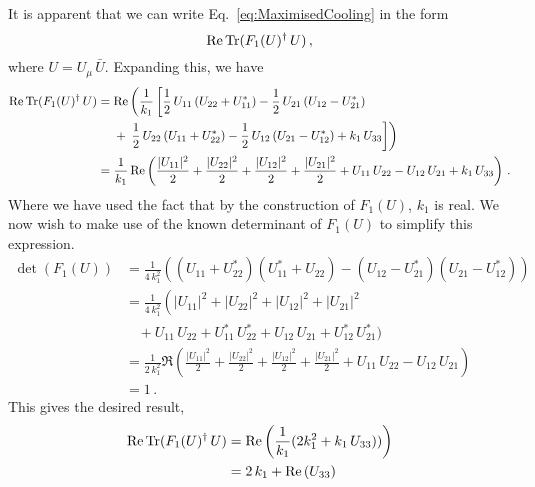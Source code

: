 It is apparent that we can write Eq.~\ref{eq:MaximisedCooling} in the form
\begin{equation}
\operatorname{Re}\operatorname{Tr}(F_1(U)^\dagger\, U)\, ,
\end{equation}
where $U = U_\mu\, \bar{U}$. Expanding this, we have
\begin{align*}
\operatorname{Re}\operatorname{Tr}(F_1(U)^\dagger\, U) &=\operatorname{Re} \left(\frac{1}{k_1}\left[ \frac{1}{2}\,U_{11} \left(U_{22} + U_{11}^*\right) - \frac{1}{2}\,U_{21} \left(U_{12} - U_{21}^*\right)\right.\right.\\
&~~~~+ \left. \left.\frac{1}{2}\,U_{22} \left(U_{11} + U_{22}^*\right)
- \frac{1}{2}\,U_{12} \left(U_{21} - U_{12}^*\right) +k_1\,U_{33}\right]\right)\\
&= \frac{1}{k_1}\operatorname{Re}\left(\frac{|U_{11}|^2}{2} + \frac{|U_{22}|^2}{2} + \frac{|U_{12}|^2}{2} + \frac{|U_{21}|^2}{2} + U_{11}\,U_{22} - U_{12}\,U_{21} + k_1\,U_{33}\right)\, .
\end{align*}
Where we have used the fact that by the construction of $F_1(U)$, $k_1$ is real. We now wish to make use of the known determinant of $F_1(U)$ to simplify this expression.
\begin{align*}
\det(F_1(U)) &= \frac{1}{4\,k_1^2} \left(\left(U_{11}+ U_{22}^*\right)\left(U_{11}^* + U_{22}\right)-\left(U_{12} - U_{21}^*\right)\left( U_{21} - U_{12}^*\right)\right)\\
&=\frac{1}{4\,k_1^2}\left( |U_{11}|^2 + |U_{22}|^2 + |U_{12}|^2 + |U_{21}|^2\right.\\
&~~~~+ U_{11}\,U_{22} + U_{11}^*\,U_{22}^* + U_{12}\,U_{21} + U_{12}^*\,U_{21}^*\big)\\
&= \frac{1}{2\,k_1^2}\Re\left(\frac{|U_{11}|^2}{2} + \frac{|U_{22}|^2}{2} + \frac{|U_{12}|^2}{2} + \frac{|U_{21}|^2}{2} + U_{11}\,U_{22} - U_{12}\,U_{21}\right)\\
&=1\, .
\end{align*}
This gives the desired result,
\begin{align*}
\operatorname{Re}\operatorname{Tr}(F_1(U)^\dagger\, U) &= \operatorname{Re}\left(\frac{1}{k_1}(2k_1^2 + k_1\,U_{33}))\right)\\
&=2\,k_1 + \operatorname{Re}\left(U_{33}\right)
\end{align*}